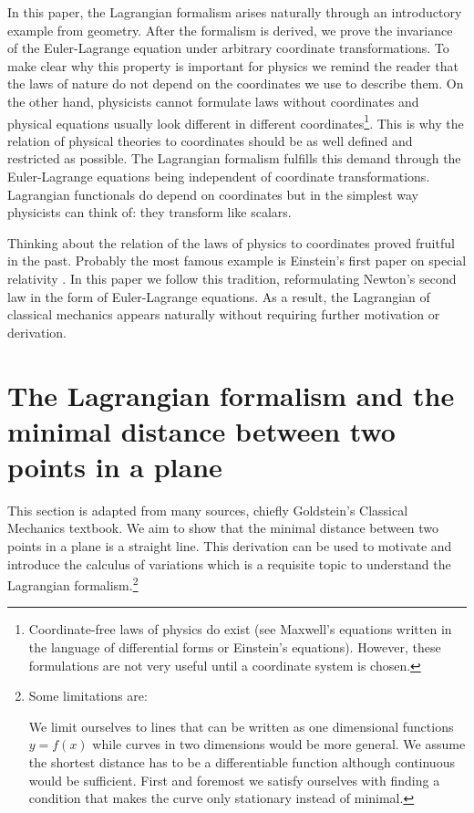 \documentclass[prb,preprint]{revtex4-1}
\begin{document}
In this paper, the Lagrangian formalism arises naturally through an introductory example from geometry. After the formalism is derived, we prove the invariance of the Euler-Lagrange equation under arbitrary coordinate transformations. To make clear why this property is important for physics we remind the reader that the laws of nature do not depend on the coordinates we use to describe them. On the other hand, physicists cannot formulate laws without coordinates and physical equations usually look different in different coordinates\footnote{Coordinate-free laws of physics do exist (see Maxwell's equations written in the language of differential forms or Einstein's equations). However, these formulations are not very useful until a coordinate system is chosen.}. This is why the relation of physical theories to coordinates should be as well defined and restricted as possible. The Lagrangian formalism fulfills this demand through the Euler-Lagrange equations being independent of coordinate transformations. Lagrangian functionals do depend on coordinates but in the simplest way physicists can think of: they transform like scalars.

Thinking about the relation of the laws of physics to coordinates proved fruitful in the past.
Probably the most famous example is Einstein's first paper on special relativity \cite{EinsteinSpecialRelativity}.
In this paper we follow this tradition, reformulating Newton's second law in the form of Euler-Lagrange equations. As a result, the Lagrangian of classical mechanics appears naturally without requiring further motivation or derivation. 


\section{The Lagrangian formalism and the minimal distance between two points in a plane}\label{distance}

This section is adapted from many sources, chiefly Goldstein's Classical Mechanics textbook\cite{goldstein2002classical}. We aim to show that the minimal distance between two points in a plane is a straight line. This derivation can be used to motivate and introduce the calculus of variations which is a requisite topic to understand the Lagrangian formalism.\footnote{Some limitations are:

We limit ourselves to lines that can be written as one dimensional functions $y=f(x)$ while curves in two dimensions would be more general. We assume the shortest distance has to be a differentiable function although continuous would be sufficient. First and foremost we satisfy ourselves with finding a condition that makes the curve only stationary instead of minimal.}
\end{document}
